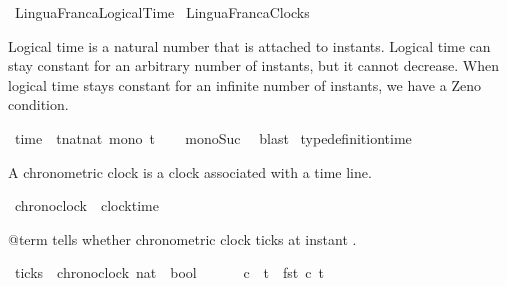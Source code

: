 %
\begin{isabellebody}%
%
%
\isadelimtheory
%
\endisadelimtheory
%
\isatagtheory
{}\isamarkupfalse%
\ LinguaFrancaLogicalTime\isanewline
\isanewline
{}\ LinguaFrancaClocks\isanewline
\isanewline
{}%
\endisatagtheory
{\isafoldtheory}%
%
\isadelimtheory
%
\endisadelimtheory
%
\isadelimdocument
%
\endisadelimdocument
%
\isatagdocument
%
\isamarkuptrue%
%
\endisatagdocument
{\isafolddocument}%
%
\isadelimdocument
%
\endisadelimdocument
%
\begin{isamarkuptext}%
Logical time is a natural number that is attached to instants.
Logical time can stay constant for an arbitrary number of instants, but it cannot decrease.
When logical time stays constant for an infinite number of instants, we have a Zeno condition.%
\end{isamarkuptext}\isamarkuptrue%
\isamarkupfalse%
\ time\ {\isacharequal}\ {\isacartoucheopen}{\isacharbraceleft}t{\isacharcolon}{\isacharcolon}nat{\isasymRightarrow}nat{\isachardot}\ mono\ t{\isacharbraceright}{\isacartoucheclose}\isanewline
%
\isadelimproof
\ \ %
\endisadelimproof
%
\isatagproof
{}\isamarkupfalse%
\ mono{\isacharunderscore}Suc\ \isamarkupfalse%
\ blast%
\endisatagproof
{\isafoldproof}%
%
\isadelimproof
\isanewline
%
\endisadelimproof
\isanewline
{}\isamarkupfalse%
\ type{\isacharunderscore}definition{\isacharunderscore}time%
\begin{isamarkuptext}%
A chronometric clock is a clock associated with a time line.%
\end{isamarkuptext}\isamarkuptrue%
\isamarkupfalse%
\ chronoclock\ {\isacharequal}\ {\isacartoucheopen}clock{\isasymtimes}time{\isacartoucheclose}%
\begin{isamarkuptext}%
@term{} tells whether chronometric clock  ticks at instant .%
\end{isamarkuptext}\isamarkuptrue%
\isamarkupfalse%
\ ticks\ {\isacharcolon}{\isacharcolon}\ {\isacartoucheopen}{\isacharbrackleft}chronoclock{\isacharcomma}\ nat{\isacharbrackright}\ {\isasymRightarrow}\ bool{\isacartoucheclose}\ {\isacharparenleft}\ {\isacartoucheopen}{\isasymnabla}{\isacartoucheclose}\ {}{}{\isacharparenright}\isanewline
\ \ \ {\isacartoucheopen}c\ {\isasymnabla}\ t\ {\isasymequiv}\ {\isacharparenleft}fst\ c{\isacharparenright}\ t{\isacartoucheclose}%

\end{isabellebody}
